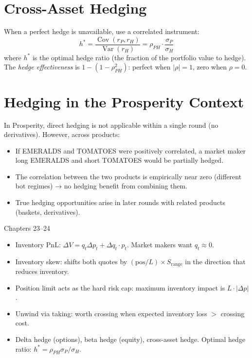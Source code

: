\documentclass[12pt,a4paper,openany]{report}
\theoremstyle{definition}
\newcommand{\Var}{\operatorname{Var}}
\newcommand{\Cov}{\operatorname{Cov}}
\begin{document}
\section{Cross-Asset Hedging}

When a perfect hedge is unavailable, use a correlated instrument:
\[
  h^* = \frac{\Cov(r_P, r_H)}{\Var(r_H)} = \rho_{PH} \cdot \frac{\sigma_P}{\sigma_H}
\]
where $h^*$ is the optimal hedge ratio (the fraction of the portfolio value to hedge). The \emph{hedge effectiveness} is $1 - (1 - \rho_{PH}^2)$: perfect when $|\rho| = 1$, zero when $\rho = 0$.

\section{Hedging in the Prosperity Context}

In Prosperity, direct hedging is not applicable within a single round (no derivatives). However, across products:
\begin{itemize}
  \item If EMERALDS and TOMATOES were positively correlated, a market maker long EMERALDS and short TOMATOES would be partially hedged.
  \item The correlation between the two products is empirically near zero (different bot regimes) → no hedging benefit from combining them.
  \item True hedging opportunities arise in later rounds with related products (baskets, derivatives).
\end{itemize}

\begin{takeawaybox}{Chapters 23--24}
\begin{itemize}
  \item Inventory PnL: $\Delta V = q_t \Delta p_t + \Delta q_t \cdot p_t$. Market makers want $q_t \approx 0$.
  \item Inventory skew: shifts both quotes by $(\text{pos}/L) \times S_{\text{range}}$ in the direction that reduces inventory.
  \item Position limit acts as the hard risk cap: maximum inventory impact is $L \cdot |\Delta p|$.
  \item Unwind via taking: worth crossing when expected inventory loss $> $ crossing cost.
  \item Delta hedge (options), beta hedge (equity), cross-asset hedge. Optimal hedge ratio: $h^* = \rho_{PH}\sigma_P/\sigma_H$.
\end{itemize}
\end{takeawaybox}
\end{document}
